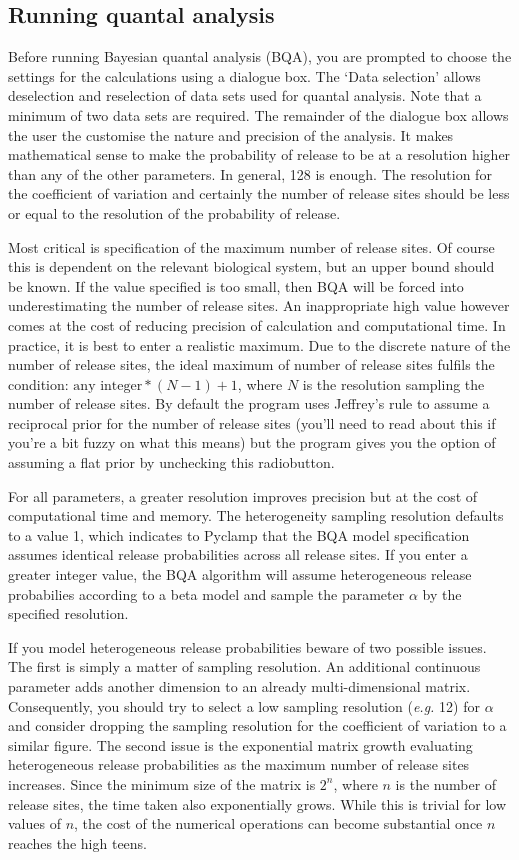 \documentclass{article}
\begin{document}
\subsection{Running quantal analysis}

Before running Bayesian quantal analysis (BQA), you are prompted to choose the settings for the calculations using a
dialogue box. The `Data selection' allows deselection and reselection of data sets used for quantal analysis. Note that
a minimum of two data sets are required. The remainder of the dialogue box allows the user the customise the nature and
precision of the analysis. It makes mathematical sense to make the probability of release to be at a resolution higher
than any of the other parameters. In general, 128 is enough. The resolution for the coefficient of variation and
certainly the number of release sites should be less or equal to the resolution of the probability of release.

Most critical is specification of the maximum number of release sites. Of course this is dependent on the relevant
biological system, but an upper bound should be known. If the value specified is too small, then BQA will be forced into
underestimating the number of release sites. An inappropriate high value however comes at the cost of reducing precision
of calculation and computational time. In practice, it is best to enter a realistic maximum. Due to the discrete nature
of the number of release sites, the ideal maximum of number of release sites fulfils the condition: $\textrm{any
integer}*(N-1)+1$, where $N$ is the resolution sampling the number of release sites. By default the program uses
Jeffrey's rule to assume a reciprocal prior for the number of release sites (you'll need to read about this if you're a
bit fuzzy on what this means) but the program gives you the option of assuming a flat prior by unchecking this
radiobutton.

For all parameters, a greater resolution improves precision but at the cost of computational time and memory. The
heterogeneity sampling resolution defaults to a value 1, which indicates to Pyclamp that the BQA model specification
assumes identical release probabilities across all release sites. If you enter a greater integer value, the BQA
algorithm will assume heterogeneous release probabilies according to a beta model and sample the parameter $\alpha$ by
the specified resolution. 

If you model heterogeneous release probabilities beware of two possible issues. The first is simply a matter of sampling
resolution. An additional continuous parameter adds another dimension to an already multi-dimensional matrix.
Consequently, you should try to select a low sampling resolution (\textit{e.g.} 12) for $\alpha$ and consider dropping
the sampling resolution for the coefficient of variation to a similar figure. The second issue is the exponential matrix
growth evaluating heterogeneous release probabilities as the maximum number of release sites increases. Since the
minimum size of the matrix is $2^n$, where $n$ is the number of release sites, the time taken also exponentially grows.
While this is trivial for low values of $n$, the cost of the numerical operations can become substantial once $n$
reaches the high teens.
\end{document}

